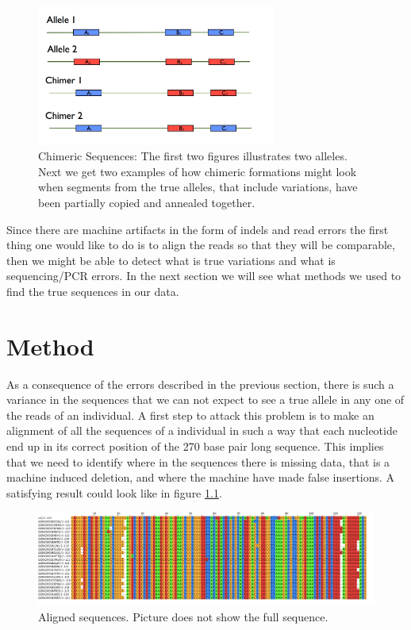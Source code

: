 \documentclass[a4paper,11pt]{kth-mag}
\begin{document}
\begin{figure}[ht]
	\centering
		\includegraphics[width=0.7\textwidth]{../pictures/Chimers.jpg}
		\caption{Chimeric Sequences: The first two figures illustrates two alleles. Next we get two examples of how chimeric formations might look when segments from the true alleles, that include variations, have been partially copied and annealed together.}
	\label{fig:chimeric_sequences}
\end{figure}


Since there are machine artifacts in the form of indels and read errors the first thing one would like to do is to align the reads so that they will be comparable, then we might be able to detect what is true variations and what is sequencing/PCR errors. In the next section we will see what methods we used to find the true sequences in our data.




\chapter{Method}

As a consequence of the errors described in the previous section, there is such a variance in the sequences that we can not expect to see a true allele in any one of the reads of an individual. A first step to attack this problem is to make an alignment of all the sequences of a individual in such a way that each nucleotide end up in its correct position of the 270 base pair long sequence. This implies that we need to identify where in the sequences there is missing data, that is a machine induced deletion, and where the machine have made false insertions. A satisfying result could look like in figure \ref{fig:dream_scenario}.

\begin{figure}[ht]
	\centering
		\includegraphics[width=\textwidth]{../pictures/align_with_ref_cropped.png}
	\caption{Aligned sequences. Picture does not show the full sequence.}
	\label{fig:dream_scenario}
\end{figure}
\end{document}
